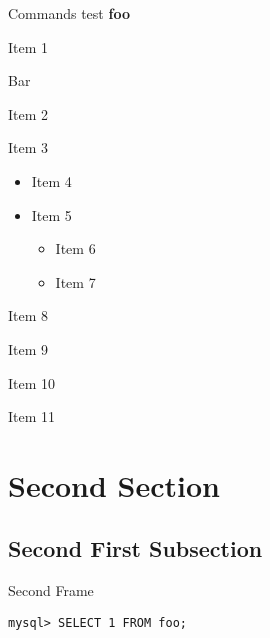 \documentclass[aspectratio=169]{beamer}
\begin{document}
\begin{frame}{Commands test}
	\textbf{foo}
	\begin{vfilleditems}
		\item Item 1
		\item \alert{Bar}
	\end{vfilleditems}
	\begin{fixedvfilleditems}
		\item Item 2
		\item Item 3
		\begin{itemize}
			\item Item 4
			\item Item 5
			\begin{itemize}
				\item Item 6
				\item Item 7
			\end{itemize}
		\end{itemize}
		\item Item 8
		\item Item 9
		\item Item 10
		\item Item 11
	\end{fixedvfilleditems}
\end{frame}


\section{Second Section}

\subsection{Second First Subsection}

\begin{frame}[fragile]{Second Frame}
	\lstset{language=SQL}
	\begin{lstlisting}
mysql> SELECT 1 FROM foo;
	\end{lstlisting}
\end{frame}
\end{document}
